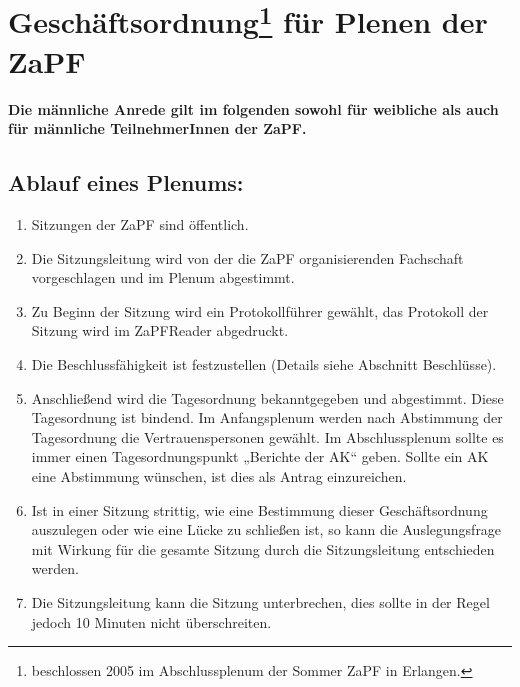 




\chapter*{Geschäftsordnung\footnote{beschlossen 2005 im Abschlussplenum der Sommer ZaPF in Erlangen.} für Plenen der ZaPF}


\noindent \textbf{Die männliche Anrede gilt im folgenden sowohl für
weibliche als auch für männliche
 TeilnehmerInnen der ZaPF.}

\section{Ablauf eines Plenums:}

\begin{enumerate}
  \item Sitzungen der ZaPF sind öffentlich.
  \item Die Sitzungsleitung wird von der die ZaPF organisierenden Fachschaft vorgeschlagen und im Plenum abgestimmt.
  \item Zu Beginn der Sitzung wird ein Protokollführer gewählt, das Protokoll der Sitzung wird im ZaPFReader
        abgedruckt.
  \item Die Beschlussfähigkeit ist festzustellen (Details siehe Abschnitt Beschlüsse).
  \item Anschließend wird die Tagesordnung bekanntgegeben und abgestimmt. Diese Tagesordnung ist
        bindend. Im Anfangsplenum werden nach Abstimmung der Tagesordnung die Vertrauenspersonen gewählt.
        Im Abschlussplenum sollte es immer einen Tagesordnungspunkt „Berichte der AK“ geben.
        Sollte ein AK eine Abstimmung wünschen, ist dies als Antrag einzureichen.
  \item Ist in einer Sitzung strittig, wie eine Bestimmung dieser Geschäftsordnung auszulegen oder wie eine
        Lücke zu schließen ist, so kann die Auslegungsfrage mit Wirkung für die gesamte Sitzung durch die
        Sitzungsleitung entschieden werden.
  \item Die Sitzungsleitung kann die Sitzung unterbrechen, dies sollte in der Regel jedoch 10 Minuten nicht
        überschreiten.
\end{enumerate}


